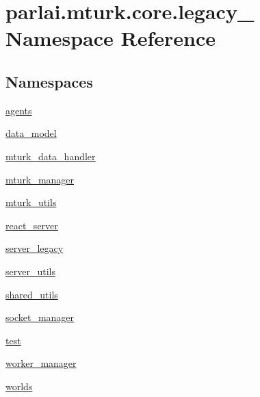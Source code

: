 \hypertarget{namespaceparlai_1_1mturk_1_1core_1_1legacy__2018}{}\section{parlai.\+mturk.\+core.\+legacy\+\_ Namespace Reference}
\label{namespaceparlai_1_1mturk_1_1core_1_1legacy__2018}
\subsection*{Namespaces}
\begin{DoxyCompactItemize}
\item 
 \hyperlink{namespaceparlai_1_1mturk_1_1core_1_1legacy__2018_1_1agents}{agents}
\item 
 \hyperlink{namespaceparlai_1_1mturk_1_1core_1_1legacy__2018_1_1data__model}{data\+\_\+model}
\item 
 \hyperlink{namespaceparlai_1_1mturk_1_1core_1_1legacy__2018_1_1mturk__data__handler}{mturk\+\_\+data\+\_\+handler}
\item 
 \hyperlink{namespaceparlai_1_1mturk_1_1core_1_1legacy__2018_1_1mturk__manager}{mturk\+\_\+manager}
\item 
 \hyperlink{namespaceparlai_1_1mturk_1_1core_1_1legacy__2018_1_1mturk__utils}{mturk\+\_\+utils}
\item 
 \hyperlink{namespaceparlai_1_1mturk_1_1core_1_1legacy__2018_1_1react__server}{react\+\_\+server}
\item 
 \hyperlink{namespaceparlai_1_1mturk_1_1core_1_1legacy__2018_1_1server__legacy}{server\+\_\+legacy}
\item 
 \hyperlink{namespaceparlai_1_1mturk_1_1core_1_1legacy__2018_1_1server__utils}{server\+\_\+utils}
\item 
 \hyperlink{namespaceparlai_1_1mturk_1_1core_1_1legacy__2018_1_1shared__utils}{shared\+\_\+utils}
\item 
 \hyperlink{namespaceparlai_1_1mturk_1_1core_1_1legacy__2018_1_1socket__manager}{socket\+\_\+manager}
\item 
 \hyperlink{namespaceparlai_1_1mturk_1_1core_1_1legacy__2018_1_1test}{test}
\item 
 \hyperlink{namespaceparlai_1_1mturk_1_1core_1_1legacy__2018_1_1worker__manager}{worker\+\_\+manager}
\item 
 \hyperlink{namespaceparlai_1_1mturk_1_1core_1_1legacy__2018_1_1worlds}{worlds}
\end{DoxyCompactItemize}
